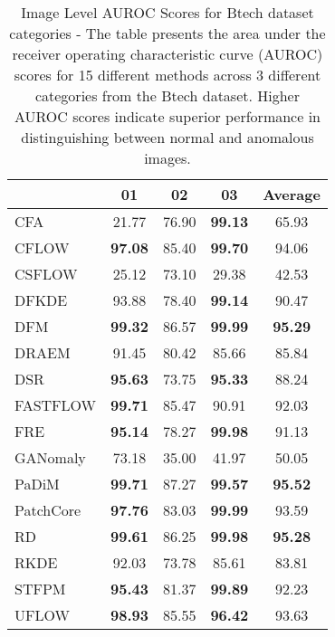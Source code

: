 \begin{table}[h!]
    \centering
    \captionsetup{justification=raggedright}
        \begin{tabular}{l*{4}{c}}
        \toprule
         & 01 & 02 & 03 & Average \\
        \midrule
        CFA & 21.77 & 76.90 & \textbf{99.13} & 65.93 \\
        CFLOW & \textbf{97.08} & 85.40 & \textbf{99.70} & 94.06 \\
        CSFLOW & 25.12 & 73.10 & 29.38 & 42.53 \\
        DFKDE & 93.88 & 78.40 & \textbf{99.14} & 90.47 \\
        DFM & \textbf{99.32} & 86.57 & \textbf{99.99} & \textbf{95.29} \\
        DRAEM & 91.45 & 80.42 & 85.66 & 85.84 \\
        DSR & \textbf{95.63} & 73.75 & \textbf{95.33} & 88.24 \\
        FASTFLOW & \textbf{99.71} & 85.47 & 90.91 & 92.03 \\
        FRE & \textbf{95.14} & 78.27 & \textbf{99.98} & 91.13 \\
        GANomaly & 73.18 & 35.00 & 41.97 & 50.05 \\
        PaDiM & \textbf{99.71} & 87.27 & \textbf{99.57} & \textbf{95.52} \\
        PatchCore & \textbf{97.76} & 83.03 & \textbf{99.99} & 93.59 \\
        RD & \textbf{99.61} & 86.25 & \textbf{99.98} & \textbf{95.28} \\
        RKDE & 92.03 & 73.78 & 85.61 & 83.81 \\
        STFPM & \textbf{95.43} & 81.37 & \textbf{99.89} & 92.23 \\
        UFLOW & \textbf{98.93} & 85.55 & \textbf{96.42} & 93.63 \\
        \bottomrule
        \end{tabular}
    \caption{Image Level AUROC Scores for Btech\cite{Mishra_2021_btech} dataset categories - The table presents the area under the receiver operating characteristic curve (AUROC) scores for 15 different methods across 3 different categories from the Btech dataset. Higher AUROC scores indicate superior performance in distinguishing between normal and anomalous images.}
    \label{table:Btech Image AUROC}
\end{table}